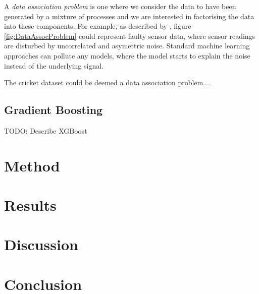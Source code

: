 \documentclass[12pt,a4paper]{report}
\theoremstyle{definition}
\begin{document}
A \emph{data association problem} is one where we consider the data to have been generated by a mixture of processes and we are interested in factorising the data into these components. For example, as described by \citet{Kaiser2018}, figure \ref{fig:DataAssocProblem} could represent faulty sensor data, where sensor readings are disturbed by uncorrelated and asymettric noise. Standard machine learning approaches can pollute any models, where the model starts to explain the noise instead of the underlying signal. 

The cricket dataset could be deemed a data association problem....

\citep{Kaiser2018}
\citep{Lui2020}

\section{Gradient Boosting}

TODO: Describe XGBoost


\chapter{Method}

\chapter{Results}

\chapter{Discussion}

\chapter{Conclusion}
\end{document}
